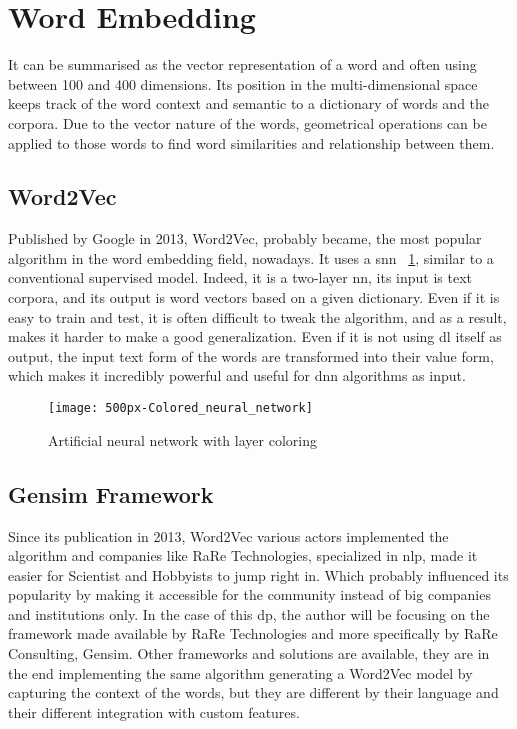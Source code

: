 \section{Word Embedding}
\label{stoa:word-embedding}
It can be summarised as the vector representation of a word and often using between 100 and 400 dimensions. Its position in the multi-dimensional space keeps track of the word context and semantic to a dictionary of words and the corpora. Due to the vector nature of the words, geometrical operations can be applied to those words to find word similarities and relationship between them. 


\subsection{Word2Vec}
\label{stoa:word2vec}
Published by Google in 2013, Word2Vec\cite{article:word2vec}, probably became, the most popular algorithm in the word embedding field, nowadays. It uses a \gls{snn} ~\ref{fig:wikipedia_colored_neural_network_img}, similar to a conventional supervised model. Indeed, it is a two-layer \gls{nn}, its input is text corpora, and its output is word vectors based on a given dictionary. Even if it is easy to train and test, it is often difficult to tweak the algorithm, and as a result, makes it harder to make a good generalization. Even if it is not using \gls{dl} itself as output, the input text form of the words are transformed into their value form, which makes it incredibly powerful and useful for \gls{dnn} algorithms as input.

\begin{figure}[ht!]
    \centering
    \texttt{[image: 500px-Colored\_neural\_network]}
    \caption{
       Artificial neural network with layer coloring \cite{wikipedia:colored_neural_network_img}
    }
    \label{fig:wikipedia_colored_neural_network_img}
\end{figure}


\subsection{Gensim Framework}
\label{stoa:gensim}
Since its publication in 2013, Word2Vec\cite{article:word2vec} various actors implemented the algorithm and companies like RaRe Technologies\cite{company:rare-technologies}, specialized in \gls{nlp}, made it easier for Scientist and Hobbyists to jump right in. Which probably influenced its popularity by making it accessible for the community instead of big companies and institutions only. In the case of this \gls{dp}, the author will be focusing on the framework made available by RaRe Technologies and more specifically by RaRe Consulting\cite{company:rare-consulting}, Gensim\cite{article:rehurek_lrec}. Other frameworks and solutions are available, they are in the end implementing the same algorithm generating a Word2Vec model by capturing the context of the words, but they are different by their language and their different integration with custom features.\\

